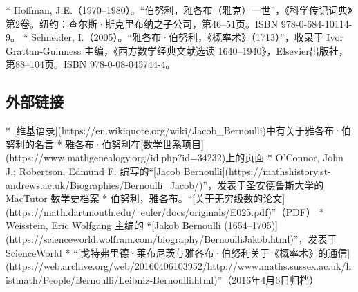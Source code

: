 * Hoffman, J.E.（1970–1980）。“伯努利，雅各布（雅克）一世”，《科学传记词典》第2卷。纽约：查尔斯·斯克里布纳之子公司，第46–51页。ISBN 978-0-684-10114-9。
* Schneider, I.（2005）。“雅各布·伯努利，《概率术》（1713）”，收录于 Ivor Grattan-Guinness 主编，《西方数学经典文献选读 1640–1940》，Elsevier出版社，第88–104页。ISBN 978-0-08-045744-4。

\subsection{外部链接}

* [维基语录](https://en.wikiquote.org/wiki/Jacob_Bernoulli)中有关于雅各布·伯努利的名言
* 雅各布·伯努利在[数学世系项目](https://www.mathgenealogy.org/id.php?id=34232)上的页面
* O'Connor, John J.; Robertson, Edmund F. 编写的“[Jacob Bernoulli](https://mathshistory.st-andrews.ac.uk/Biographies/Bernoulli_Jacob/)”，发表于圣安德鲁斯大学的 MacTutor 数学史档案
* 伯努利，雅各布。“[关于无穷级数的论文](https://math.dartmouth.edu/~euler/docs/originals/E025.pdf)”（PDF）
* Weisstein, Eric Wolfgang 主编的 “[Jakob Bernoulli (1654–1705)](https://scienceworld.wolfram.com/biography/BernoulliJakob.html)”，发表于 ScienceWorld
* “[戈特弗里德·莱布尼茨与雅各布·伯努利关于《概率术》的通信](https://web.archive.org/web/20160406103952/http://www.maths.sussex.ac.uk/histmath/People/Bernoulli/Leibniz-Bernoulli.html)”（2016年4月6日归档）
